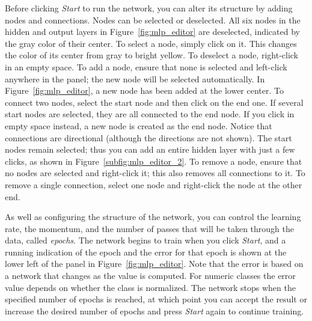 Before clicking \textit{Start} to run the network, you can alter its
structure by adding nodes and connections. Nodes can be selected or
deselected. All six nodes in the hidden and output layers in
Figure~\ref{fig:mlp_editor} are deselected, indicated by the gray
color of their center. To select a node, simply click on it. This
changes the color of its center from gray to bright yellow. To
deselect a node, right-click in an empty space. To add a node, ensure
that none is selected and left-click anywhere in the panel; the new
node will be selected automatically. In Figure~\ref{fig:mlp_editor}, a
new node has been added at the lower center. To connect two nodes,
select the start node and then click on the end one. If several start
nodes are selected, they are all connected to the end node. If you
click in empty space instead, a new node is created as the end
node. Notice that connections are directional (although the directions
are not shown). The start nodes remain selected; thus you can add an
entire hidden layer with just a few clicks, as shown in
Figure~\ref{subfig:mlp_editor_2}. To remove a node, ensure that no nodes
are selected and right-click it; this also removes all connections to
it. To remove a single connection, select one node and right-click the
node at the other end.

As well as configuring the structure of the network, you can control
the learning rate, the momentum, and the number of passes that will be
taken through the data, called \textit{epochs}. The network begins to
train when you click {\em Start}, and a running indication of the epoch and
the error for that epoch is shown at the lower left of the panel in
Figure~\ref{fig:mlp_editor}. Note that the error is based on a network
that changes as the value is computed. For numeric classes the error
value depends on whether the class is normalized. The network stops
when the specified number of epochs is reached, at which point you can
accept the result or increase the desired number of epochs and press
\textit{Start} again to continue training.

